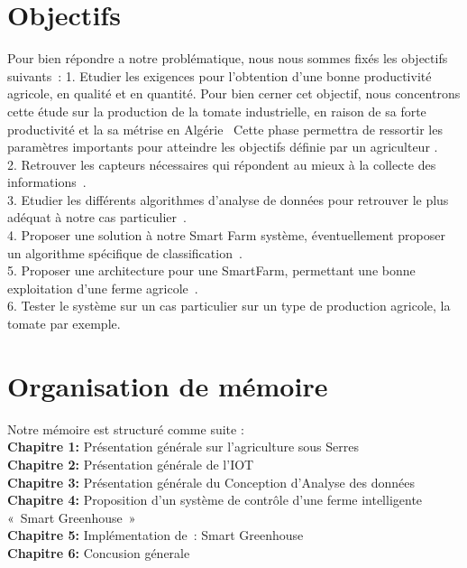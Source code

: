 \section*{Objectifs }
Pour bien répondre a notre problématique, nous nous sommes fixés les objectifs suivants : 
	1.	Etudier les exigences pour l’obtention d’une bonne productivité agricole, en qualité et en quantité. Pour bien cerner cet objectif, nous concentrons cette étude sur la production de la 
tomate industrielle, en raison de sa forte productivité et la sa métrise en Algérie  Cette phase permettra de ressortir les paramètres importants pour atteindre les objectifs définie par un agriculteur .
\\
	2.	Retrouver les capteurs nécessaires qui répondent au mieux à la collecte des informations .
\\
    3.	Etudier les différents algorithmes d’analyse de données pour retrouver le plus adéquat à notre cas particulier .
\\
    4.	Proposer une solution à notre Smart Farm système, éventuellement proposer un algorithme spécifique de classification .
\\
    5.	Proposer une architecture pour une SmartFarm, permettant une bonne exploitation d’une ferme agricole .
\\
    6.	Tester le système sur un cas particulier sur un type de production agricole, la tomate par exemple.  

\section*{Organisation de mémoire }
Notre mémoire est structuré comme suite : 
\\
\textbf{Chapitre 1: }
Présentation générale sur l’agriculture sous Serres
\\
\textbf{Chapitre 2: }
Présentation générale de l’IOT
\\
\textbf{Chapitre 3: }
Présentation générale du Conception d’Analyse des données
\\
\textbf{Chapitre 4: }
Proposition d’un système de contrôle d’une ferme intelligente « Smart Greenhouse »  
\\
\textbf{Chapitre 5:}
Implémentation de : Smart Greenhouse
\\
\textbf{Chapitre 6:}
Concusion génerale